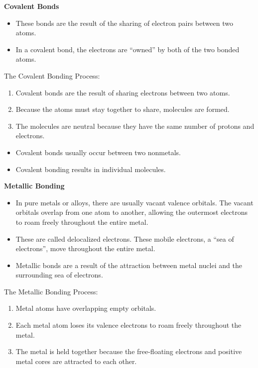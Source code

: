 \documentclass[../hchem.tex]{subfiles}
\begin{document}
\textbf{Covalent Bonds}
\begin{itemize}
    \item These bonds are the result of the sharing of electron pairs between two atoms.
    \item In a covalent bond, the electrons are ``owned'' by both of the two bonded atoms.
\end{itemize}

The Covalent Bonding Process:
\begin{enumerate}
    \item Covalent bonds are the result of sharing electrons between two atoms.
    \item Because the atoms must stay together to share, molecules are formed.
    \item The molecules are neutral because they have the same number of protons and electrons.
\end{enumerate}

\begin{itemize}
    \item Covalent bonds usually occur between two nonmetals.
    \item Covalent bonding results in individual molecules.
\end{itemize}

\textbf{Metallic Bonding}
\begin{itemize}
    \item In pure metals or alloys, there are usually vacant valence orbitals. The vacant orbitals overlap from one atom to another, allowing the outermost electrons to roam freely throughout the entire metal.
    \item These are called delocalized electrons. These mobile electrons, a ``sea of electrons'', move throughout the entire metal.
    \item Metallic bonds are a result of the attraction between metal nuclei and the surrounding sea of electrons.
\end{itemize}

The Metallic Bonding Process:
\begin{enumerate}
    \item Metal atoms have overlapping empty orbitals.
    \item Each metal atom loses its valence electrons to roam freely throughout the metal.
    \item The metal is held together because the free-floating electrons and positive metal cores are attracted to each other.
\end{enumerate}
\end{document}
